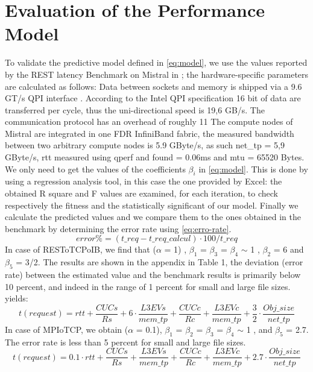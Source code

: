 \documentclass[runningheads]{llncs}
\begin{document}
\section{Evaluation of the Performance Model} \label{sec:evaluation}
To validate the predictive model defined in \cref{eq:model}, we use the values reported by the REST latency Benchmark on Mistral in ; the hardware-specific parameters are calculated as follows:
Data between sockets and memory is shipped via a 9.6 GT/s QPI interface \cite{intel-xeon}. According to the Intel QPI specification \cite{intel-qpi} 16 bit of data are transferred per cycle, thus the uni-directional speed is 19,6 GB/s. The communication protocol has an overhead of roughly 11 %
The compute nodes of Mistral are integrated in one FDR InfiniBand fabric, the measured bandwidth between two arbitrary compute nodes is 5.9 GByte/s, as such net\_tp = 5,9 GByte/s, rtt measured using qperf and found = 0.06ms and mtu = 65520 Bytes.
We only need to get the values of the coefficients $\beta_i$ in \cref{eq:model}. This is done by using a regression analysis tool, in this case the one provided by Excel: the obtained R square and F values are examined, for each iteration, to check respectively the fitness and the statistically significant of our model. Finally we calculate the predicted values and we compare them to the ones obtained in the benchmark by determining the error rate using \cref{eq:erro-rate}.
\begin{equation}
 error\%=(t\_req -t\_req\_calcul)\cdot100/t\_req
\label{eq:error-rate}
\end{equation}
In case of RESToTCPoIB, we find that ($\alpha$ = 1) , $\beta_1$ = $\beta_3$ = $\beta_4$ $\sim$ 1 , $\beta_2$ = 6 and $\beta_5$ = 3/2. 
The results are shown in the appendix in Table 1, the deviation (error rate) between the estimated value and the benchmark results is primarily below 10 percent, and indeed in the range of 1 percent for small and large file sizes. yields:
\begin{equation}
\label{eq:model-rest}
t(request)=rtt+\frac{CUCs}{Rs}+6\cdot\frac{L3EVs}{mem\_tp}+\frac{CUCc}{Rc}+\frac{L3EVc}{mem\_tp}+\frac{3}{2}\cdot\frac{Obj\_size}{net\_tp}
\end{equation}
In case of MPIoTCP, we obtain ($\alpha$ = 0.1), $\beta_1$ = $\beta_2$ = $\beta_3$ = $\beta_4$ $\sim$ 1 , and $\beta_5$ = 2.7. The error rate is less than 5 percent for small and large file sizes.
\begin{equation}
\label{eq:model-rest}
t(request)=0.1\cdot rtt+\frac{CUCs}{Rs}+\frac{L3EVs}{mem\_tp}+\frac{CUCc}{Rc}+\frac{L3EVc}{mem\_tp}+2.7\cdot\frac{Obj\_size}{net\_tp}
\end{equation}
\end{document}
